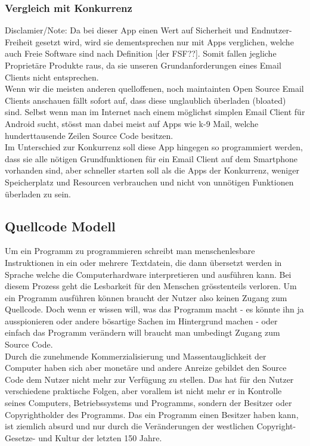 \documentclass[a4paper,11pt]{article}
\begin{document}
\subsubsection{Vergleich mit Konkurrenz}
Disclamier/Note: Da bei dieser App einen Wert auf Sicherheit und Endnutzer-Freiheit gesetzt wird, wird sie dementsprechen nur mit Apps verglichen, welche auch Freie Software sind nach Definition [der FSF??]. Somit fallen jegliche Proprietäre Produkte raus, da sie unseren Grundanforderungen eines Email Clients nicht entsprechen.\\

Wenn wir die meisten anderen quelloffenen, noch maintainten Open Source Email Clients anschauen fällt sofort auf, dass diese unglaublich überladen (bloated) sind. Selbst wenn man im Internet nach einem möglichst simplen Email Client für Android sucht, stösst man dabei meist auf Apps wie k-9 Mail, welche hunderttausende Zeilen Source Code besitzen.\\

Im Unterschied zur Konkurrenz soll diese App hingegen so programmiert werden, dass sie alle nötigen Grundfunktionen für ein Email Client auf dem Smartphone vorhanden sind, aber schneller starten soll als die Apps der Konkurrenz, weniger Speicherplatz und Resourcen verbrauchen und nicht von unnötigen Funktionen überladen zu sein.

\subsection{Quellcode Modell}
Um ein Programm zu programmieren schreibt man menschenlesbare Instruktionen in ein oder mehrere Textdatein, die dann übersetzt werden in Sprache welche die Computerhardware interpretieren und ausführen kann. Bei diesem Prozess geht die Lesbarkeit für den Menschen grösstenteils verloren. Um ein Programm ausführen können braucht der Nutzer also keinen Zugang zum Quellcode. Doch wenn er wissen will, was das Programm macht - es könnte ihn ja ausspionieren oder andere bösartige Sachen im Hintergrund machen - oder einfach das Programm verändern will braucht man umbedingt Zugang zum Source Code.\\

Durch die zunehmende Kommerzialisierung und Massentauglichkeit der Computer haben sich aber monetäre und andere Anreize gebildet den Source Code dem Nutzer nicht mehr zur Verfügung zu stellen. Das hat für den Nutzer verschiedene praktische Folgen, aber vorallem ist nicht mehr er in Kontrolle seines Computers, Betriebssystems und Programms, sondern der Besitzer oder Copyrightholder des Programms. Das ein Programm einen Besitzer haben kann, ist ziemlich absurd und nur durch die Veränderungen der westlichen Copyright- Gesetze- und Kultur der letzten 150 Jahre.\\
\end{document}
